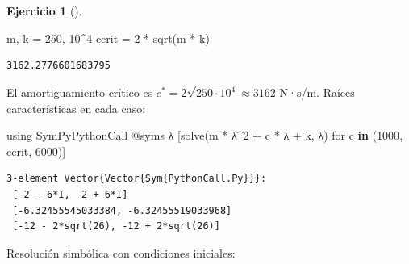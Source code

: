\documentclass[
  spanish,
  a4paper,
]{scrreport}
\newenvironment{Shaded}{\begin{snugshade}}{\end{snugshade}}
\newcommand{\BuiltInTok}[1]{\textcolor[rgb]{0.00,0.23,0.31}{#1}}
\newcommand{\FloatTok}[1]{\textcolor[rgb]{0.68,0.00,0.00}{#1}}
\newcommand{\FunctionTok}[1]{\textcolor[rgb]{0.28,0.35,0.67}{#1}}
\newcommand{\ImportTok}[1]{\textcolor[rgb]{0.00,0.46,0.62}{#1}}
\newcommand{\KeywordTok}[1]{\textcolor[rgb]{0.00,0.23,0.31}{\textbf{#1}}}
\newcommand{\NormalTok}[1]{\textcolor[rgb]{0.00,0.23,0.31}{#1}}
\newcommand{\OperatorTok}[1]{\textcolor[rgb]{0.37,0.37,0.37}{#1}}
\newcommand{\PreprocessorTok}[1]{\textcolor[rgb]{0.68,0.00,0.00}{#1}}
\theoremstyle{definition}
\newtheorem{exercise}{Ejercicio}[chapter]
\theoremstyle{remark}
\begin{document}
\begin{exercise}[]
\begin{enumerate}
\begin{tcolorbox}
\begin{Shaded}
\begin{Highlighting}[]
\NormalTok{m, k }\OperatorTok{=} \FloatTok{250}\NormalTok{, }\FloatTok{10}\OperatorTok{\^{}}\FloatTok{4}
\NormalTok{ccrit }\OperatorTok{=} \FloatTok{2} \OperatorTok{*} \FunctionTok{sqrt}\NormalTok{(m }\OperatorTok{*}\NormalTok{ k)}
\end{Highlighting}
\end{Shaded}

\begin{verbatim}
3162.2776601683795
\end{verbatim}

  El amortiguamiento crítico es
  \(c^* = 2\sqrt{250\cdot 10^4} \approx 3162\) N·s/m. Raíces
  características en cada caso:

\begin{Shaded}
\begin{Highlighting}[]
\ImportTok{using} \BuiltInTok{SymPyPythonCall}
\PreprocessorTok{@syms}\NormalTok{ λ}
\NormalTok{[}\FunctionTok{solve}\NormalTok{(m }\OperatorTok{*}\NormalTok{ λ}\OperatorTok{\^{}}\FloatTok{2} \OperatorTok{+}\NormalTok{ c }\OperatorTok{*}\NormalTok{ λ }\OperatorTok{+}\NormalTok{ k, λ) for c }\KeywordTok{in}\NormalTok{ (}\FloatTok{1000}\NormalTok{, ccrit, }\FloatTok{6000}\NormalTok{)]}
\end{Highlighting}
\end{Shaded}

\begin{verbatim}
3-element Vector{Vector{Sym{PythonCall.Py}}}:
 [-2 - 6*I, -2 + 6*I]
 [-6.32455545033384, -6.32455519033968]
 [-12 - 2*sqrt(26), -12 + 2*sqrt(26)]
\end{verbatim}

  Resolución simbólica con condiciones iniciales:


\end{tcolorbox}
\end{enumerate}
\end{exercise}
\end{document}
